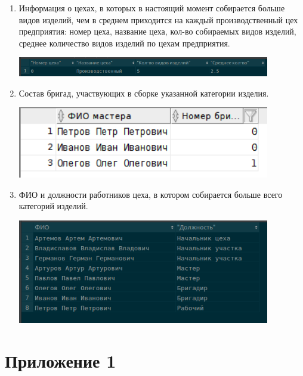 \begin{enumerate}
    \item Информация о цехах, в которых в настоящий момент собирается больше видов изделий, чем в среднем приходится на каждый производственный цех предприятия: номер цеха, название цеха, кол-во собираемых видов изделий, среднее количество видов изделий по цехам предприятия.

    

    \includegraphics[width=11cm]{./screenshots/results/result8.png}

    \item Состав бригад, участвующих в сборке указанной категории изделия.

    

    \includegraphics[width=11cm]{./screenshots/results/result9.png}

    \item ФИО и должности работников цеха, в котором собирается больше всего категорий изделий.

    

    \includegraphics[width=11cm]{./screenshots/results/result10.png}

\end{enumerate}

\section{Приложение 1}

